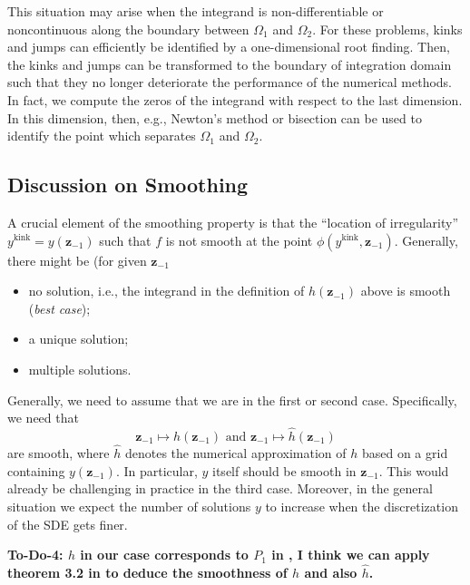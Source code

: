 \documentclass[11pt]{article}
\begin{document}
This situation may arise when the integrand is non-differentiable or noncontinuous along the boundary between $\Omega_1$ and $\Omega_2$. For these problems, kinks and jumps can efficiently be identified by a one-dimensional root finding. Then, the kinks and jumps can
be transformed to the boundary of integration domain such that they no longer deteriorate the performance of the numerical methods. In fact, we  compute the zeros of the integrand  with respect to  the last dimension. In this dimension, then, e.g., Newton's method or bisection can be used to identify the point which separates $\Omega_1$ and $\Omega_2$.







\subsection{Discussion on Smoothing}\label{sec:smoothing}


A crucial element of the smoothing property is that the ``location of
irregularity'' $y^{\text{kink}} = y(\mathbf{z}_{-1})$ such that $f$ is not smooth at the point $\phi(y^{\text{kink}}, \mathbf{z}_{-1})$. Generally, there might be (for given $\mathbf{z}_{-1}$
\begin{itemize}
	\item no solution, i.e., the integrand in the definition of $h(\mathbf{z}_{-1})$ above
	is smooth (\textit{best case});
	\item a unique solution;
	\item multiple solutions.
\end{itemize}

Generally, we need to assume that we are in the first or second
case. Specifically, we need that
\begin{equation*}
	\mathbf{z}_{-1} \mapsto h(\mathbf{z}_{-1}) \text{ and } \mathbf{z}_{-1} \mapsto \hat{h}(\mathbf{z}_{-1})
\end{equation*}
are smooth, where $\hat{h}$ denotes the numerical approximation of $h$ based
on a grid containing $y(\mathbf{z}_{-1})$. In particular, $y$ itself should be smooth
in $\mathbf{z}_{-1}$. This would already be challenging in practice in the third
case. Moreover, in the general situation we expect the number of solutions $y$
to increase when the discretization of the SDE gets finer.

\textbf{To-Do-4:  $h$ in our case corresponds to $P_1$ in \cite{griebel2013smoothing}, I think we can apply theorem 3.2 in \cite{griebel2013smoothing} to deduce the smoothness of $h$ and also $\hat{h}$.}
	
\end{document}
